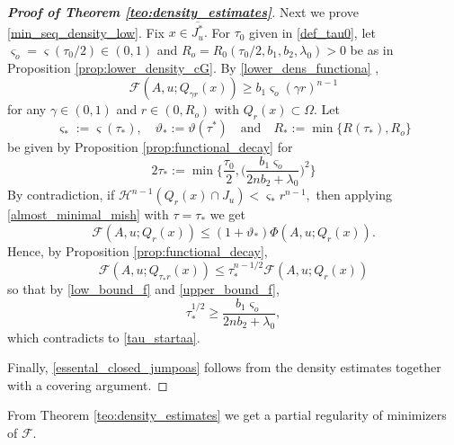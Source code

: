 \documentclass[reqno]{amsart}
\numberwithin{equation}{section}
\theoremstyle{plain}
\theoremstyle{definition}
\newcommand{\cH}{\mathcal{H}}
\newcommand{\cF}{\mathcal{F}}
\newcommand{\cl}[1]{\overline{#1}}
\newcommand{\bound}{b}
\begin{document}
\begin{proof}[\textbf{Proof of Theorem \ref{teo:density_estimates}}]
Next we prove \eqref{min_seq_density_low}. Fix $x\in \cl{J_u^*}.$
%
For $\tau_0$ given in \eqref{def_tau0},  let $\varsigma_o=\varsigma(\tau_0/2)\in(0,1)$ and $R_o=R_0(\tau_0/2,\bound_1,\bound_2,\lambda_0)>0$ be as in Proposition \ref{prop:lower_density_cG}. By \eqref{lower_dens_functiona} ,
%
\begin{equation}\label{low_bound_f}
\cF(A,u; Q_{\gamma r}(x)) \ge \bound_1\varsigma_o  (\gamma r)^{n-1}  
\end{equation}
%
for any $\gamma\in(0,1)$ and $r\in(0,R_o)$ with $Q_r(x)\subset\Omega.$ Let 
$$
\varsigma_*:=\varsigma(\tau_*),\quad 
\vartheta_*:=\vartheta(\tau^*)\quad\text{and}\quad 
R_*:=\min\{R(\tau_*),R_o\}
$$ 
be given by Proposition \ref{prop:functional_decay} for
\begin{equation}\label{tau_startaa}
2\tau_*:=\min\Big\{\frac{\tau_0}{2},\Big(\frac{\bound_1\varsigma_o }{2n\bound_2+\lambda_0}\Big)^2\Big\} 
\end{equation}
By contradiction, if $\cH^{n-1} (Q_r(x)\cap J_u)<\varsigma_* r^{n-1},$ then applying \eqref{almost_minimal_mish} with $\tau=\tau_*$ we get
%
$$
\cF(A,u;Q_r(x)) \le (1 + \vartheta_*) \Phi(A,u;Q_r(x)).
$$
Hence, by Proposition \ref{prop:functional_decay},
$$
\cF(A,u;Q_{\tau_* r}(x)) \le \tau_*^{n-1/2} \cF(A,u;Q_r(x)) 
$$
so that by \eqref{low_bound_f} and \eqref{upper_bound_f},
$$
\tau_*^{1/2} \ge \frac{\bound_1\varsigma_o }{2n\bound_2 + \lambda_0}, 
$$
which contradicts to \eqref{tau_startaa}.  

Finally, \eqref{essental_closed_jumpoas} follows from the density estimates together with a covering argument.
\end{proof}


From Theorem \ref{teo:density_estimates} we get a partial regularity of minimizers of $\cF$.
\end{document}
